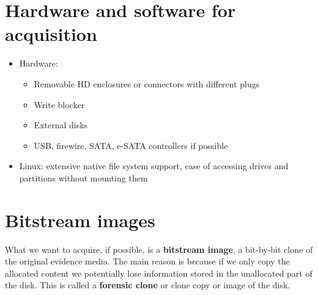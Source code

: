 \section{Hardware and software for acquisition}
    \begin{itemize}
        \item Hardware:
        \begin{itemize}
            \item Removable HD enclosures or connectors with different plugs
            \item Write blocker
            \item External disks 
            \item USB, firewire, SATA, e-SATA controllers if possible
        \end{itemize}
        \item Linux: extensive native file system support, ease of accessing drives and partitions without mounting them
    \end{itemize}
\section{Bitstream images}
    What we want to acquire, if possible, is a \textbf{bitstream image}, a bit-by-bit clone of the original evidence media. The main reason is because if we only copy the allocated content we potentially lose information stored in the unallocated part of the disk. This is called a \textbf{forensic clone} or clone copy or image of the disk.
